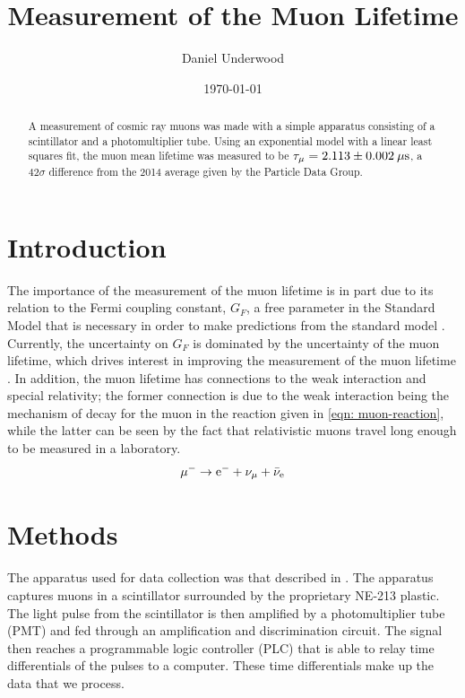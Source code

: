 \documentclass[reprint]{revtex4-1}
\begin{document}
\title{Measurement of the Muon Lifetime}
\author{Daniel Underwood}
\date{\today}

\newcommand{\result}{2.113 \pm 0.002\:\rm{\mu s}}

\begin{abstract}
A measurement of cosmic ray muons was made with a simple apparatus consisting of a scintillator and a photomultiplier tube. Using an exponential model with a linear least squares fit, the muon mean lifetime was measured to be $\tau_{\mu} = \result$, a $42\sigma$ difference from the 2014 average given by the Particle Data Group.
\end{abstract}
\maketitle

\section{Introduction}

The importance of the measurement of the muon lifetime is in part due to its relation to the Fermi coupling constant, $G_F$, a free parameter in the Standard Model that is necessary in order to make predictions from the standard model \citep{Chitwood2007,Barczyk2008}. Currently, the uncertainty on $G_F$ is dominated by the uncertainty of the muon lifetime, which drives interest in improving the measurement of the muon lifetime \cite{Chitwood2007}. In addition, the muon lifetime has connections to the weak interaction and special relativity; the former connection is due to the weak interaction being the mechanism of decay for the muon in the reaction given in \cref{eqn: muon-reaction}, while the latter can be seen by the fact that relativistic muons travel long enough to be measured in a laboratory.
\begin{equation}
\mu^{-} \rightarrow \rm{e}^{-} + \nu_{\mu} + \bar{\nu}_{\rm{e}}
\label{eqn: muon-reaction}
\end{equation}

\section{Methods}

The apparatus used for data collection was that described in \cite{Coan2005}. The apparatus captures muons in a scintillator surrounded by the proprietary NE-213 plastic. The light pulse from the scintillator is then amplified by a photomultiplier tube (PMT) and fed through an amplification and discrimination circuit. The signal then reaches a programmable logic controller (PLC) that is able to relay time differentials of the pulses to a computer. These time differentials make up the data that we process.
\end{document}
